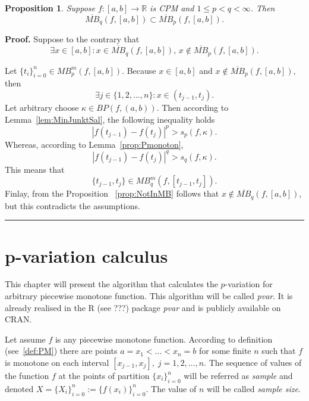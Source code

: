 \documentclass[12pt, a4paper]{article}
\newtheorem{proposition}[theorem]{Proposition}
\newenvironment{proof}[1][Proof]{\noindent \textbf{#1.} }{\  \rule{0.5em}{0.5em}}
\numberwithin{equation}{section}
\begin{document}
\begin{proposition}\label{prop:MBMonoton} 
  Suppose $f:[a,b] \rightarrow \mathbb{R}$ is CPM and 
  $1 \leq p < q < \infty$. Then
  $$\overline{MB}_{q}(f,[a,b]) \subset \overline{MB}_{p}(f,[a,b]). $$
\end{proposition}
\begin{proof}
  Suppose to the contrary that
  \begin{equation*}
  \exists x \in[a,b]:x \in \overline{MB}_{q}(f,[a,b]),\,x \notin \overline{MB}_{p}(f,[a,b]).   
  \end{equation*}

  Let $\{t_i\}_{i=0}^n \in MB_p^m(f,[a,b])$. 
  Because $x \in [a,b]$ and $x \notin \overline{MB}_{p}(f,[a,b])$, then
  \begin{equation}\label{eq:xinj}
    \exists j \in\{1,2,\dots,n\}:x\in (t_{j-1},t_j). 
  \end{equation}
  Let arbitrary choose $\kappa \in BP(f,(a,b))$.
  Then according to Lemma~\ref{lem:MinJunktSal}, the following inequality holds
  \begin{equation*}
    |f(t_{j-1})-f(t_{j})|^p > s_p(f, \kappa).
  \end{equation*}
  Whereas, according to Lemma~\ref{prop:Pmonoton},
  \begin{equation*}
    |f(t_{j-1})-f(t_{j})|^q > s_q(f, \kappa).
  \end{equation*} 
  This means that
  $$\{t_{j-1}, t_j \} \in MB_q^m(f,[t_{j-1},t_j]).$$ 
  Finlay, from the Proposition~ \ref{prop:NotInMB} follows that $x \notin \overline{MB}_q(f,[a,b])$,
  but this contradicts the assumptions.
\end{proof}
  
\section{p-variation calculus}  
  
This chapter will present the algorithm that calculates 
the $p$-variation for arbitrary piecewise monotone function. 
This algorithm will be called \emph{pvar}. 
It is already realised in the R (see ???) package \emph{pvar} and
is publicly available on CRAN.

Let assume $f$ is any piecewise monotone function.  
According to definition (see~\ref{def:PM}) 
there are points $a=x_1<\dots<x_n=b$ for some finite $n$ such 
that $f$ is monotone on each interval $[x_{j-1},x_j],\;j=1,2,\dots,n$.
The sequence of values of the function $f$ 
at the points of partition $\{x_{i}\}_{i=0}^{n}$ will be
referred as \emph{sample} and denoted $X=\{X_{i}\}_{i=0}^{n}:=\{f(x_{i})\}_{i=0}^{n}$. 
The value of $n$ will be called \emph{sample size}.
\end{document}
